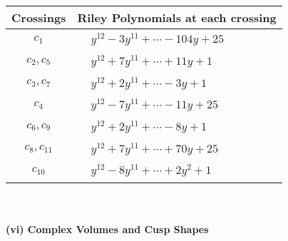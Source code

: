 \documentclass[1p]{elsarticle_modified}
\theoremstyle{definition}
\begin{document}
\begin{tabular}{m{50pt}|m{274pt}}
Crossings & \hspace{64pt}Riley Polynomials at each crossing \\
\hline $$\begin{aligned}c_{1}\end{aligned}$$&$\begin{aligned}
&y^{12}-3 y^{11}+\cdots-104 y+25
\end{aligned}$\\
\hline $$\begin{aligned}c_{2},c_{5}\end{aligned}$$&$\begin{aligned}
&y^{12}+7 y^{11}+\cdots+11 y+1
\end{aligned}$\\
\hline $$\begin{aligned}c_{3},c_{7}\end{aligned}$$&$\begin{aligned}
&y^{12}+2 y^{11}+\cdots-3 y+1
\end{aligned}$\\
\hline $$\begin{aligned}c_{4}\end{aligned}$$&$\begin{aligned}
&y^{12}-7 y^{11}+\cdots-11 y+25
\end{aligned}$\\
\hline $$\begin{aligned}c_{6},c_{9}\end{aligned}$$&$\begin{aligned}
&y^{12}+2 y^{11}+\cdots-8 y+1
\end{aligned}$\\
\hline $$\begin{aligned}c_{8},c_{11}\end{aligned}$$&$\begin{aligned}
&y^{12}+7 y^{11}+\cdots+70 y+25
\end{aligned}$\\
\hline $$\begin{aligned}c_{10}\end{aligned}$$&$\begin{aligned}
&y^{12}-8 y^{11}+\cdots+2 y^2+1
\end{aligned}$\\
\hline
\end{tabular}\\~\\
\newpage\flushleft \textbf{(vi) Complex Volumes and Cusp Shapes}
\end{document}
